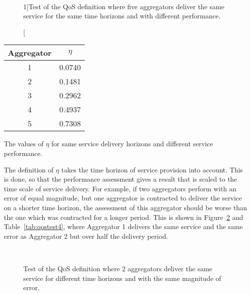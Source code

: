 \begin{figure}[htb!]
\centering
{} \\
\caption[][1\baselineskip]{Test of the QoS definition where five aggregators deliver the same service for the same time horizons and with different performance.}
\label{fig:indextest3}
\end{figure}

\begin{margintable}%
	\centering
	\begin{tabular}{cc}
		\toprule
		Aggregator & $\eta$ \\
		\midrule
		1 & 0.0740 \\
		2 & 0.1481 \\
		3 & 0.2962 \\
		4 & 0.4937 \\
		5 & 0.7308 \\
		\bottomrule
	\end{tabular}
	\caption{The values of $\eta$ for same service delivery horizons and different service performance.}
	\label{tab:qostest3}
\end{margintable}
The definition of $\eta$ takes the time horizon of service provision into account. This is done, so that the performance assessment gives a result that is scaled to the time scale of service delivery. For example, if two aggregators perform with an error of equal magnitude, but one aggregator is contracted to deliver the service on a shorter time horizon, the assessment of this aggregator should be worse than the one which was contracted for a longer period. This is shown in Figure~\ref{fig:indextest4} and Table~\ref{tab:qostest4}, where Aggregator 1 delivers the same service and the same error as Aggregator 2 but over half the delivery period.

\begin{figure}[htb!]
\centering
{}\\
\caption{Test of the QoS definition where 2 aggregators deliver the same service for different time horizons and with the same magnitude of error.}
\label{fig:indextest4}
\end{figure}

